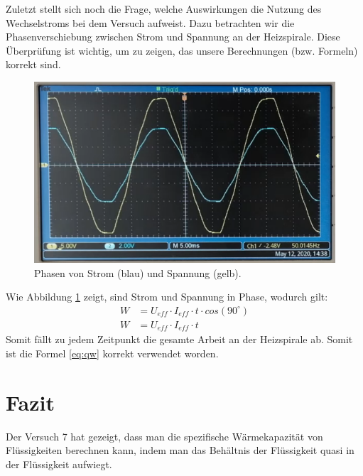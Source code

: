 \documentclass[10pt,a4paper]{article}
\newcommand{\vnr}{7}
\begin{document}
\begin{flushleft}
Zuletzt stellt sich noch die Frage, welche Auswirkungen die Nutzung des Wechselstroms bei dem Versuch aufweist. Dazu betrachten wir die Phasenverschiebung zwischen Strom und Spannung an der Heizspirale. Diese Überprüfung ist wichtig, um zu zeigen, das unsere Berechnungen (bzw. Formeln) korrekt sind.
\begin{figure}[H]
\centering
\includegraphics[scale=0.5]{screen_phasen}
\caption{Phasen von Strom (blau) und Spannung (gelb).}
\label{fig:phasen}
\end{figure}
Wie Abbildung \ref{fig:phasen} zeigt, sind Strom und Spannung in Phase, wodurch gilt:
\begin{align*}
W &= U_{eff} \cdot I_{eff} \cdot t \cdot cos(90^{\circ}) \\
W &= U_{eff} \cdot I_{eff} \cdot t
\end{align*}
Somit fällt zu jedem Zeitpunkt die gesamte Arbeit an der Heizspirale ab. Somit ist die Formel \ref{eq:qw} korrekt verwendet worden.
\end{flushleft}

\section{Fazit}
\begin{flushleft}
Der Versuch \vnr\hspace{1pt} hat gezeigt, dass man die spezifische Wärmekapazität von Flüssigkeiten berechnen kann, indem man das Behältnis der Flüssigkeit quasi in der Flüssigkeit aufwiegt.
\end{flushleft}

\begingroup
\raggedright
\sloppy
\printbibliography[heading=bibintoc,title={6 \hspace{6pt} Literatur}]
\endgroup
\end{document}
